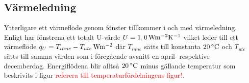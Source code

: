 \subsection{Värmeledning}

Ytterligare ett värmeflöde genom fönster tillkommer i och med värmeledning. Enligt \cite{petersarneo} har fönstrena ett totalt U-värde $U=\unit[1,0]{Wm^{-2}K^{-1}}$ vilket leder till ett värmeflöde $q_{U}=\unit[T_{inne}-T_{ute}]{Wm^{-2}}$ där $T_{inne}$ sätts till konstanta $\unit[20]{^{\circ}C}$ och $T_{ute}$ sätts till samma värden som i föregående avsnitt en april- respektive decemberdag. Energiflödena blir alltså $\unit[20]{^{\circ}C}$ minus gällande temperatur som beskrivits i figur \textcolor{red}{referera till temperaturfördelningens figur!}.
